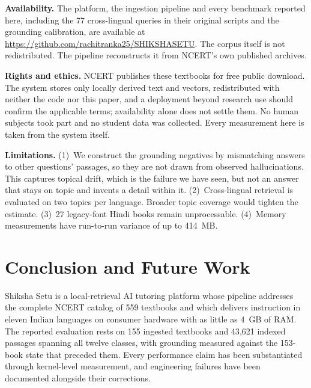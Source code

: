 \textbf{Availability.} The platform, the ingestion pipeline and every benchmark reported here, including the 77 cross-lingual queries in their original scripts and the grounding calibration, are available at \url{https://github.com/rachitranka25/SHIKSHASETU}. The corpus itself is not redistributed. The pipeline reconstructs it from NCERT's own published archives.

\textbf{Rights and ethics.} NCERT publishes these textbooks for free public download. The system stores only locally derived text and vectors, redistributed with neither the code nor this paper, and a deployment beyond research use should confirm the applicable terms; availability alone does not settle them. No human subjects took part and no student data was collected. Every measurement here is taken from the system itself.

\textbf{Limitations.} (1)~We construct the grounding negatives by mismatching answers to other questions' passages, so they are not drawn from observed hallucinations. This captures topical drift, which is the failure we have seen, but not an answer that stays on topic and invents a detail within it. (2)~Cross-lingual retrieval is evaluated on two topics per language. Broader topic coverage would tighten the estimate. (3)~27 legacy-font Hindi books remain unprocessable. (4)~Memory measurements have run-to-run variance of up to 414~MB.

\section{Conclusion and Future Work}

Shiksha Setu is a local-retrieval AI tutoring platform whose pipeline addresses the complete NCERT catalog of 559 textbooks and which delivers instruction in eleven Indian languages on consumer hardware with as little as 4~GB of RAM. The reported evaluation rests on 155 ingested textbooks and 43{,}621 indexed passages spanning all twelve classes, with grounding measured against the 153-book state that preceded them. Every performance claim has been substantiated through kernel-level measurement, and engineering failures have been documented alongside their corrections.

